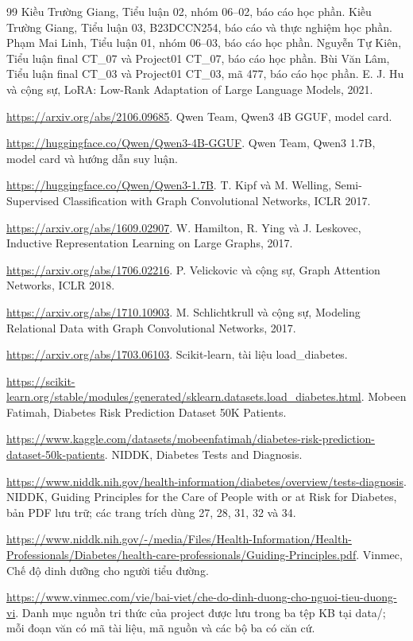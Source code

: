 \begingroup\small{}
\begin{thebibliography}{99}
 Kiều Trường Giang, Tiểu luận 02, nhóm 06--02, báo cáo học phần.
 Kiều Trường Giang, Tiểu luận 03, B23DCCN254, báo cáo và thực nghiệm học phần.
 Phạm Mai Linh, Tiểu luận 01, nhóm 06--03, báo cáo học phần.
 Nguyễn Tự Kiên, Tiểu luận final CT\_07 và Project01 CT\_07, báo cáo học phần.
 Bùi Văn Lâm, Tiểu luận final CT\_03 và Project01 CT\_03, mã 477, báo cáo học phần.
 E. J. Hu và cộng sự, LoRA: Low-Rank Adaptation of Large Language Models, 2021.\par\noindent\url{https://arxiv.org/abs/2106.09685}.
 Qwen Team, Qwen3 4B GGUF, model card.\par\noindent\url{https://huggingface.co/Qwen/Qwen3-4B-GGUF}.
 Qwen Team, Qwen3 1.7B, model card và hướng dẫn suy luận.\par\noindent\url{https://huggingface.co/Qwen/Qwen3-1.7B}.
 T. Kipf và M. Welling, Semi-Supervised Classification with Graph Convolutional Networks, ICLR 2017.\par\noindent\url{https://arxiv.org/abs/1609.02907}.
 W. Hamilton, R. Ying và J. Leskovec, Inductive Representation Learning on Large Graphs, 2017.\par\noindent\url{https://arxiv.org/abs/1706.02216}.
 P. Velickovic và cộng sự, Graph Attention Networks, ICLR 2018.\par\noindent\url{https://arxiv.org/abs/1710.10903}.
 M. Schlichtkrull và cộng sự, Modeling Relational Data with Graph Convolutional Networks, 2017.\par\noindent\url{https://arxiv.org/abs/1703.06103}.
 Scikit-learn, tài liệu load\_diabetes.\par\noindent\url{https://scikit-learn.org/stable/modules/generated/sklearn.datasets.load_diabetes.html}.
 Mobeen Fatimah, Diabetes Risk Prediction Dataset 50K Patients.\par\noindent\url{https://www.kaggle.com/datasets/mobeenfatimah/diabetes-risk-prediction-dataset-50k-patients}.
 NIDDK, Diabetes Tests and Diagnosis.\par\noindent\url{https://www.niddk.nih.gov/health-information/diabetes/overview/tests-diagnosis}.
 NIDDK, Guiding Principles for the Care of People with or at Risk for Diabetes, bản PDF lưu trữ; các trang trích dùng 27, 28, 31, 32 và 34.\par\noindent\url{https://www.niddk.nih.gov/-/media/Files/Health-Information/Health-Professionals/Diabetes/health-care-professionals/Guiding-Principles.pdf}.
 Vinmec, Chế độ dinh dưỡng cho người tiểu đường.\par\noindent\url{https://www.vinmec.com/vie/bai-viet/che-do-dinh-duong-cho-nguoi-tieu-duong-vi}.
 Danh mục nguồn tri thức của project được lưu trong ba tệp KB tại data/; mỗi đoạn văn có mã tài liệu, mã nguồn và các bộ ba có căn cứ.
\end{thebibliography}

\endgroup